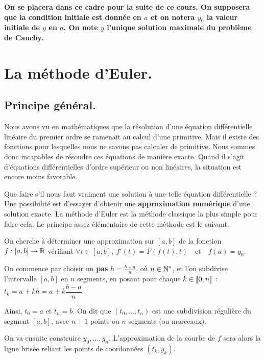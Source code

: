 \textbf{On se placera dans ce cadre pour la suite de ce cours.
On supposera que la condition initiale est donnée en $a$ et on notera
$y_{0}$ la valeur initiale de $y$ en $a$.
On note $y$ l'unique solution maximale du problème de Cauchy.}

\section{La méthode d'Euler.}

\subsection{Principe général.}

Nous avons vu en mathématiques que la résolution d'une équation différentielle linéaire du premier 
ordre se ramenait au calcul d'une primitive. Mais il existe des fonctions pour lesquelles nous ne 
savons pas calculer de primitive. Nous sommes donc incapables de résoudre ces équations de manière 
exacte. Quand il s'agit d'équations différentielles d'ordre supérieur ou non linéaires, la 
situation est encore moins favorable.


Que faire s'il nous faut vraiment une solution à une telle équation différentielle ? Une 
possibilité est d'essayer d'obtenir une \textbf{approximation numérique} d'une solution exacte. La 
méthode d'Euler est la méthode classique la plus simple pour faire cela. Le principe assez 
élémentaire de cette méthode est le suivant.


On cherche à déterminer une approximation sur $[a,b]$ de la fonction $f : [a,b] \to \mathbb{R}$ vérifiant  $
  \forall t \in [a,b],~ f'(t) = F(f(t),t) \quad\textrm{et}\quad f(a) = y_0$.
  
On commence par choisir un \textbf{pas} $  h=\frac{b-a}{n}$, où $n\in\mathbb{N}^{*}$, et l'on subdivise l'intervalle $[a,b]$ en $n$ segments, en posant pour chaque $k\in [\![0,n]\!]$ : $
  t_{k} = a + k h = a + k \dfrac{b-a}{n}$.
  
Ainsi, $t_0 = a$ et $t_n = b$. On dit que $(t_0,\dots,t_n)$ est une subdivision régulière du segment $[a,b]$, avec $n+1$ points ou $n$ segments (ou morceaux). 


On va ensuite construire $y_0,\dots,y_n$. L'approximation de la courbe de $f$ sera alors la ligne brisée reliant les points de coordonnées $(t_k,y_k)$. 

